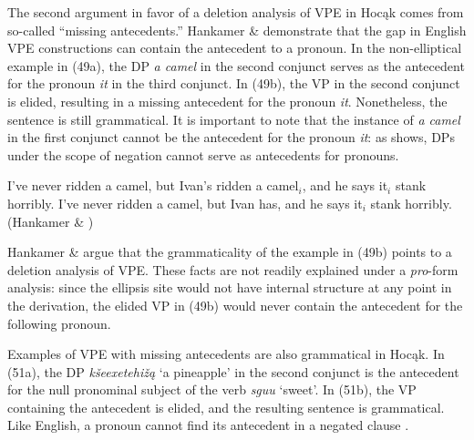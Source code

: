 \documentclass[output=paper]{LSP/langsci}
\begin{document}
The second argument in favor of a deletion analysis of VPE in Hocąk comes from so-called ``missing antecedents.'' Hankamer \& \citet{Sag1976} demonstrate that the gap in English VPE constructions can contain the antecedent to a pronoun. In the non-elliptical example in (49a), the DP \emph{a camel} in the second conjunct serves as the antecedent for the pronoun \emph{it} in the third conjunct. In (49b), the VP in the second conjunct is elided, resulting in a missing antecedent for the pronoun \emph{it}. Nonetheless, the sentence is still grammatical. It is important to note that the instance of \emph{a camel} in the first conjunct cannot be the antecedent for the pronoun \emph{it}: as  shows, DPs under the scope of negation cannot serve as antecedents for pronouns.


\begin{singlespacing}
\begin{exe}
\ex
\begin{xlist}
\ex
I've never ridden a camel, but Ivan's ridden a camel$_i$, and he says it$_i$ stank horribly.
\vspace{12pt}
\ex
I've never ridden a camel, but Ivan has, and he says it$_i$ stank horribly. (Hankamer \& \citealt[403]{Sag1976})
\end{xlist}
\end{exe}
\end{singlespacing}

\begin{exe}
\end{exe}

Hankamer \& \citet{Sag1976} argue that the grammaticality of the example in (49b) points to a deletion analysis of VPE. These facts are not readily explained under a \emph{pro}-form analysis: since the ellipsis site would not have internal structure at any point in the derivation, the elided VP in (49b) would never contain the antecedent for the following pronoun. 

Examples of VPE with missing antecedents are also grammatical in Hocąk. In (51a), the DP \emph{kšeexetehižą} `a pineapple' in the second conjunct is the antecedent for the null pronominal subject of the verb \emph{sguu} `sweet'. In (51b), the VP containing the antecedent is elided, and the resulting sentence is grammatical. Like English, a pronoun cannot find its antecedent in a negated clause .
\end{document}
